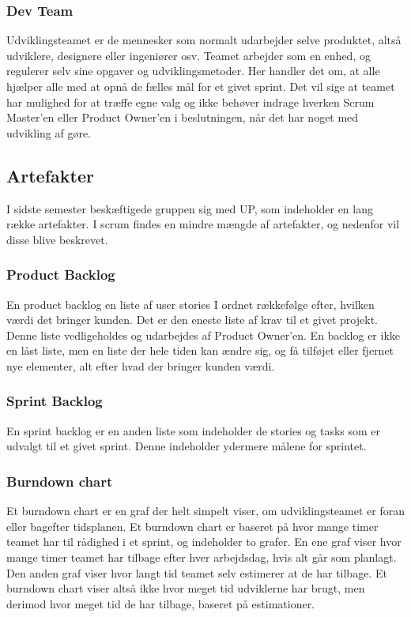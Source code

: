\subsubsection{Dev Team}
Udviklingsteamet er de mennesker som normalt udarbejder selve produktet, altså udviklere, designere 
eller ingeniører osv. Teamet arbejder som en enhed, og regulerer selv sine opgaver og udviklingsmetoder. 
Her handler det om, at alle hjælper alle med at opnå de fælles mål for et givet sprint. Det vil sige 
at teamet har mulighed for at træffe egne valg og ikke behøver indrage hverken Scrum Master’en eller 
Product Owner’en i beslutningen, når det har noget med udvikling af gøre.

\subsection{Artefakter}
I sidste semester beskæftigede gruppen sig med UP, som indeholder en lang række artefakter. I scrum findes en mindre mængde af 
artefakter, og nedenfor vil disse blive beskrevet.

\subsubsection{Product Backlog}
En product backlog en liste af user stories I ordnet rækkefølge efter, hvilken værdi det bringer kunden. 
Det er den eneste liste af krav til et givet projekt. Denne liste vedligeholdes og udarbejdes af 
Product Owner’en. En backlog er ikke en låst liste, men en liste der hele tiden kan ændre sig, og få 
tilføjet eller fjernet nye elementer, alt efter hvad der bringer kunden værdi. 

\subsubsection{Sprint Backlog}
En sprint backlog er en anden liste som indeholder de stories og tasks som er udvalgt til et givet sprint. Denne indeholder ydermere målene for sprintet. 

\subsubsection{Burndown chart}
Et burndown chart er en graf der helt simpelt viser, om udviklingsteamet er foran eller bagefter tidsplanen. Et burndown chart er baseret på hvor mange timer 
teamet har til rådighed i et sprint, og indeholder to grafer. En ene graf viser hvor mange timer teamet har tilbage efter hver arbejdsdag, hvis alt går som planlagt.
Den anden graf viser hvor langt tid teamet selv estimerer at de har tilbage. Et burndown chart viser altså ikke hvor meget tid udviklerne har brugt, men derimod hvor meget
tid de har tilbage, baseret på estimationer.

